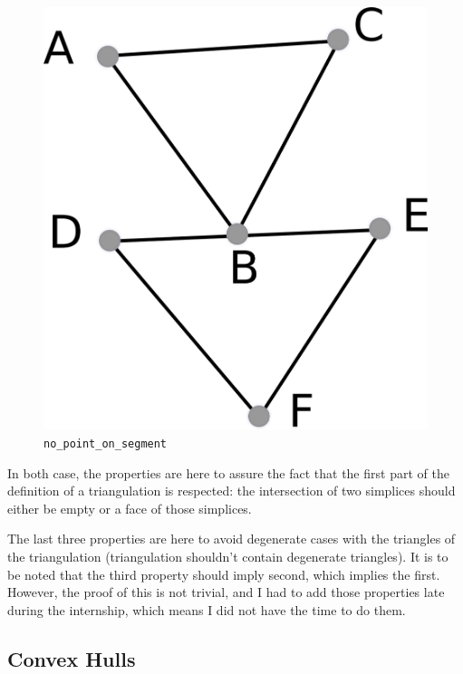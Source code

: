 \documentclass[a4paper,10pt]{article}
\begin{document}
\begin{enumerate}
\begin{figure}
\includegraphics[scale=2]{nps}
\caption{\label{nps} {\tt no\_point\_on\_segment}}
\end{figure}
\end{enumerate}
In both case, the properties are here to assure the fact that the first part of the definition of a triangulation is respected: the intersection of two simplices should either be empty or a face of those simplices.

The last three properties are here to avoid degenerate cases with the triangles of the triangulation (triangulation shouldn't contain degenerate triangles). It is to be noted that the third property should imply second, which implies the first. However, the proof of this is not trivial, and I had to add those properties late during the internship, which means I did not have the time to do them.

\subsection{Convex Hulls}
\end{document}
